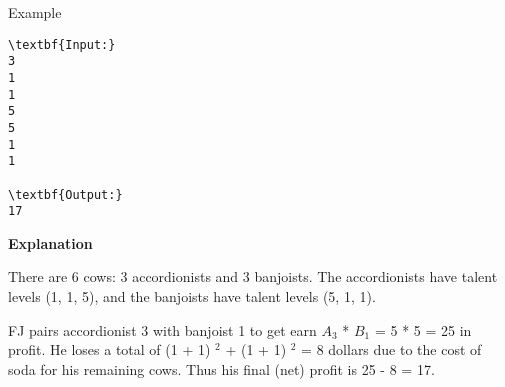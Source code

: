 Example
\begin{verbatim}
\textbf{Input:}
3
1
1
5
5
1
1

\textbf{Output:}
17
\end{verbatim}

\textbf{    Explanation   }

   There are 6 cows: 3 accordionists and 3 banjoists. The accordionists have talent levels (1, 1, 5), and the banjoists have talent levels (5, 1, 1).  

   FJ pairs accordionist 3 with banjoist 1 to get earn $A_{3}$   * $B_{1}$   = 5 * 5 = 25 in profit.  He loses a total of (1 + 1)   $^    2   $   + (1 + 1)   $^    2   $   = 8 dollars due to the cost of soda for his remaining cows. Thus his final (net) profit is 25 - 8 = 17.
